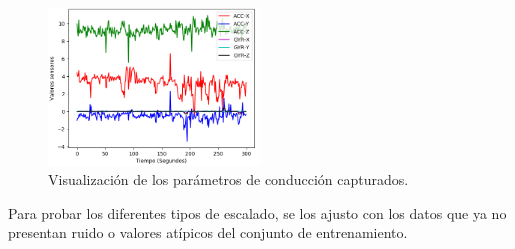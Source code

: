 \begin{figure}[h!]
  \begin{center}	\includegraphics[width=0.5\textwidth,frame]{imagenes/Cap3/datos_sin_preprocesamiento}
  \caption{Visualizaci\'{o}n de los par\'{a}metros de conducci\'{o}n capturados.}
  \label{fig:datos_puros}
  \end{center}
\end{figure}

\vspace{5mm} %

Para probar los diferentes tipos de escalado, se los ajusto con los datos que ya no presentan ruido o valores at\'{i}picos del conjunto de entrenamiento.

